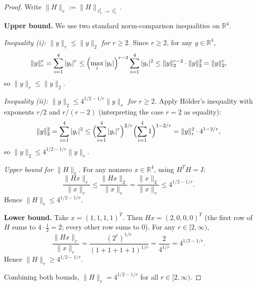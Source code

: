 \begin{proof}
Write $\|H\|_r:=\|H\|_{\ell^r_4\to\ell^r_4}$.

\textbf{Upper bound.}
We use two standard norm-comparison inequalities on $\mathbb{R}^4$.

\emph{Inequality (i): $\|y\|_r\le\|y\|_2$ for $r\ge2$.}
Since $r\ge2$, for any $y\in\mathbb{R}^4$,
\[
\|y\|_r^r=\sum_{i=1}^4|y_i|^r\le\Bigl(\max_i|y_i|\Bigr)^{r-2}\sum_{i=1}^4|y_i|^2\le\|y\|_2^{r-2}\cdot\|y\|_2^2=\|y\|_2^r,
\]
so $\|y\|_r\le\|y\|_2$.

\emph{Inequality (ii): $\|y\|_2\le 4^{1/2-1/r}\|y\|_r$ for $r\ge2$.}
Apply H\"older's inequality with exponents $r/2$ and $r/(r-2)$ (interpreting the case $r=2$ as equality):
\[
\|y\|_2^2=\sum_{i=1}^4|y_i|^2\le\Bigl(\sum_{i=1}^4|y_i|^r\Bigr)^{2/r}\Bigl(\sum_{i=1}^41\Bigr)^{1-2/r}=\|y\|_r^2\cdot4^{1-2/r},
\]
so $\|y\|_2\le4^{1/2-1/r}\|y\|_r$.

\emph{Upper bound for $\|H\|_r$.}
For any nonzero $x\in\mathbb{R}^4$, using $H^TH=I$:
\[
\frac{\|Hx\|_r}{\|x\|_r}\le\frac{\|Hx\|_2}{\|x\|_r}=\frac{\|x\|_2}{\|x\|_r}\le 4^{1/2-1/r}.
\]
Hence $\|H\|_r\le4^{1/2-1/r}$.

\textbf{Lower bound.} Take $x=(1,1,1,1)^T$. Then $Hx=(2,0,0,0)^T$ (the first row of $H$ sums to $4\cdot\frac{1}{2}=2$; every other row sums to $0$). For any $r\in[2,\infty)$,
\[
\frac{\|Hx\|_r}{\|x\|_r}=\frac{(2^r)^{1/r}}{(1+1+1+1)^{1/r}}=\frac{2}{4^{1/r}}=4^{1/2-1/r}.
\]
Hence $\|H\|_r\ge4^{1/2-1/r}$.

Combining both bounds, $\|H\|_r=4^{1/2-1/r}$ for all $r\in[2,\infty)$.
\end{proof}
